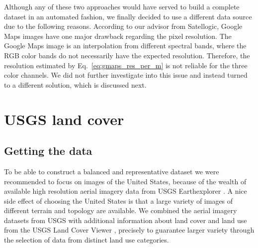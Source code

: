 Although any of these two approaches would have served to build a complete dataset in an automated fashion, we finally decided to use a different data source due to the following reasons. According to our advisor from Satellogic, Google Maps images have one major drawback regarding the pixel resolution. The Google Maps image is an interpolation from different spectral bands, where the RGB color bands do not necessarily have the expected resolution. Therefore, the resolution estimated by Eq.~\ref{eq:gmaps_res_per_m} is not reliable for the three color channels. We did not further investigate into this issue and instead turned to a different solution, which is discussed next.



\section{USGS land cover}

\subsection{Getting the data}\label{usgs_data}
To be able to construct a balanced and representative dataset we were recommended to focus on images of the United States, 
because of the wealth of available high resolution aerial imagery data from USGS Earthexplorer \parencite{usgs}. A nice side effect of choosing the United States is that a large variety of images of different terrain and topology are available. We combined the aerial imagery datasets from USGS with additional information about land cover and land use from the USGS Land Cover Viewer \parencite{land_cover_viewer}, precisely to guarantee larger variety through the selection of data from distinct land use categories.

